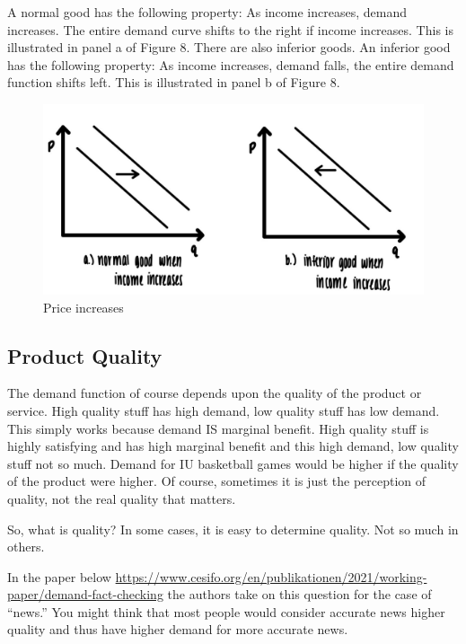 \documentclass[
]{book}
\begin{document}
A normal good has the following property: As income increases, demand increases. The entire demand curve shifts to the right if income increases. This is illustrated in panel a of Figure 8. There are also inferior goods. An inferior good has the following property: As income increases, demand falls, the entire demand function shifts left. This is illustrated in panel b of Figure 8.

\begin{figure}

{\centering \includegraphics[width=1\linewidth]{img/ch3/fig9} 

}

\caption{Price increases}\label{fig:fig309}
\end{figure}

\hypertarget{product-quality}{%
\subsection{Product Quality}\label{product-quality}}

The demand function of course depends upon the quality of the product or service. High quality stuff has high demand, low quality stuff has low demand. This simply works because demand IS marginal benefit. High quality stuff is highly satisfying and has high marginal benefit and this high demand, low quality stuff not so much. Demand for IU basketball games would be higher if the quality of the product were higher. Of course, sometimes it is just the perception of quality, not the real quality that matters.

So, what is quality? In some cases, it is easy to determine quality. Not so much in others.

In the paper below
\url{https://www.cesifo.org/en/publikationen/2021/working-paper/demand-fact-checking}
the authors take on this question for the case of ``news.'' You might think that most people would consider accurate news higher quality and thus have higher demand for more accurate news.
\end{document}
